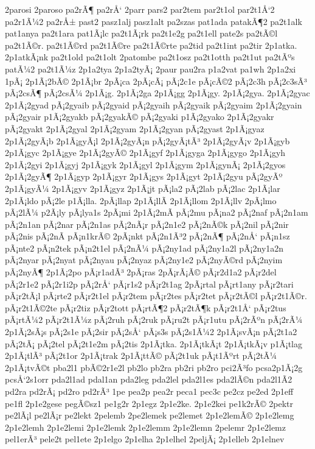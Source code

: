 {2parosi
2paroso
pa2rÃ¶
pa2rÅ‘
2parr
pars2
par2tem
par2t1ol
par2t1Å‘2
pa2r1Ã¼2
pa2rÅ±
past2
pasz1alj
pasz1alt
pa2szas
pat1ada
patakÃ¶2
pa2t1alk
pat1anya
pa2t1ara
pat1Ã¡lc
pa2t1Ã¡rk
pa2t1e2g
pa2t1ell
pate2s
pa2tÃ©l
pa2t1Ã©r.
pa2t1Ã©rd
pa2t1Ã©re
pa2t1Ã©rte
pa2tid
pa2t1int
pa2tir
2p1atka.
2p1atkÃ¡nk
pa2t1old
pa2t1olt
2patombe
pa2t1osz
pa2t1otth
pa2t1ut
pa2tÃºs
patÃ¼2
pa2t1Ã¼z
2p1a2tya
2p1a2tyÃ¡
2paur
pau2ra
p1a2vat
pa1wh
2p1a2xi
1pÃ¡
2p1Ã¡2bÃ©
2p1Ã¡br
2pÃ¡ca
2pÃ¡cÃ¡
pÃ¡2c1e
pÃ¡cÃ©2
pÃ¡2c3h
pÃ¡2c3sÃ³
pÃ¡2csÃ¶
pÃ¡2csÃ¼
2p1Ã¡g.
2p1Ã¡2ga
2p1Ã¡gg
2p1Ã¡gy.
2p1Ã¡2gya.
2p1Ã¡2gyac
2p1Ã¡2gyad
pÃ¡2gyaib
pÃ¡2gyaid
pÃ¡2gyaih
pÃ¡2gyaik
pÃ¡2gyaim
2p1Ã¡2gyain
pÃ¡2gyair
p1Ã¡2gyakb
pÃ¡2gyakÃ©
pÃ¡2gyaki
p1Ã¡2gyako
2p1Ã¡2gyakr
pÃ¡2gyakt
2p1Ã¡2gyal
2p1Ã¡2gyam
2p1Ã¡2gyan
pÃ¡2gyast
2p1Ã¡gyaz
2p1Ã¡2gyÃ¡b
2p1Ã¡gyÃ¡l
2p1Ã¡2gyÃ¡n
pÃ¡2gyÃ¡tÃ³
2p1Ã¡2gyÃ¡v
2p1Ã¡gyb
2p1Ã¡gyc
2p1Ã¡gye
2p1Ã¡2gyÃ©
2p1Ã¡gyf
2p1Ã¡gyga
2p1Ã¡gygo
2p1Ã¡gyh
2p1Ã¡2gyi
2p1Ã¡gyj
2p1Ã¡gyk
2p1Ã¡gyl
2p1Ã¡gym
2p1Ã¡gynÃ¡
2p1Ã¡2gyos
2p1Ã¡2gyÃ¶
2p1Ã¡gyp
2p1Ã¡gyr
2p1Ã¡gys
2p1Ã¡gyt
2p1Ã¡2gyu
pÃ¡2gyÃº
2p1Ã¡gyÃ¼
2p1Ã¡gyv
2p1Ã¡gyz
2p1Ã¡jt
pÃ¡la2
pÃ¡2lab
pÃ¡2lac
2p1Ã¡lar
2p1Ã¡ldo
pÃ¡2le
p1Ã¡lla.
2pÃ¡llap
2p1Ã¡llÃ­
2p1Ã¡llom
2p1Ã¡llv
2pÃ¡lmo
pÃ¡2lÃ¼
p2Ã¡ly
pÃ¡lya1s
2pÃ¡mi
2p1Ã¡2mÃ­
pÃ¡2mu
pÃ¡na2
pÃ¡2naf
pÃ¡2n1am
pÃ¡2n1an
pÃ¡2nar
pÃ¡2n1as
pÃ¡2nÃ¡r
pÃ¡2n1e2
pÃ¡2nÃ©k
pÃ¡2nil
pÃ¡2nir
pÃ¡2nis
pÃ¡2nÃ­
pÃ¡n1krÃ©
2pÃ¡nkt
pÃ¡2n1Ã³2
pÃ¡2nÃ¶
pÃ¡2nÅ‘
pÃ¡n1sz
pÃ¡nte2
pÃ¡n2tek
pÃ¡n2t1el
pÃ¡2nÃ¼
pÃ¡2ny1ad
pÃ¡2ny1a2l
pÃ¡2ny1a2n
pÃ¡2nyar
pÃ¡2nyat
pÃ¡2nyau
pÃ¡2nyaz
pÃ¡2ny1e2
pÃ¡2nyÃ©rd
pÃ¡2nyim
pÃ¡2nyÃ¶
2p1Ã¡2po
pÃ¡r1adÃ³
2pÃ¡ras
2pÃ¡rÃ¡Ã©
pÃ¡r2d1a2
pÃ¡r2del
pÃ¡2r1e2
pÃ¡2r1i2p
pÃ¡2rÅ‘
pÃ¡r1s2
pÃ¡r2t1ag
2pÃ¡rtal
pÃ¡rt1any
pÃ¡r2tari
pÃ¡r2tÃ¡l
pÃ¡rte2
pÃ¡r2t1el
pÃ¡r2tem
pÃ¡r2tes
pÃ¡r2tet
pÃ¡r2tÃ©l
pÃ¡r2t1Ã©r.
pÃ¡r2t1Ã©2te
pÃ¡r2tiz
pÃ¡r2tott
pÃ¡rtÃ¶2
pÃ¡r2tÃ¶k
pÃ¡r2t1Å‘
pÃ¡r2tus
pÃ¡rtÃ¼2
pÃ¡r2t1Ã¼z
pÃ¡2ruh
pÃ¡2ruk
pÃ¡ru2t
pÃ¡r1utu
pÃ¡2rÃºn
pÃ¡2rÃ¼
2p1Ã¡2sÃ¡s
pÃ¡2s1e
pÃ¡2sir
pÃ¡2sÅ‘
pÃ¡s3s
pÃ¡2s1Ã¼2
2p1Ã¡svÃ¡n
pÃ¡2t1a2
pÃ¡2tÃ¡
pÃ¡2tel
pÃ¡2t1e2m
pÃ¡2tis
2p1Ã¡tka.
2p1Ã¡tkÃ¡t
2p1Ã¡tkÃ¡v
p1Ã¡tlag
2p1Ã¡tlÃ³
pÃ¡2t1or
2p1Ã¡trak
2p1Ã¡ttÃ©
pÃ¡2t1uk
pÃ¡t1Ãºrt
pÃ¡2tÃ¼
2p1Ã¡tvÃ©t
pba2l1
pbÃ©2r1e2l
pb2lo
pb2ra
pb2ri
pb2ro
pci2Ã³fo
pcsa2p1Ã¡2g
pcsÅ‘2s1orr
pda2l1ad
pdal1an
pda2leg
pda2lel
pda2l1es
pda2lÃ©n
pda2l1Ã­2
pd2ra
pd2rÃ¡
pd2ro
pd2rÃ³
1pe
pea2p
pea2r
peca1
pec3c
pe2cz
pe2ed
2p1eff
pe1fl
2p1e2gese
pegÃ©sz1
pe1g2r
2p1egz
2p1e2ke.
2p1e2kei
pe1k2rÃ©
2pektr
pe2lÃ¡l
pe2lÃ¡r
pe2lekt
2pelemb
2pe2lemek
pe2lemet
2p1e2lemÃ©
2p1e2lemg
2p1e2lemh
2p1e2lemi
2p1e2lemk
2p1e2lemm
2p1e2lemn
2pelemr
2p1e2lemz
pel1erÃ³
pele2t
pel1ete
2p1elgo
2p1elha
2p1elhel
2peljÃ¡
2p1elleb
2p1elnev
}
